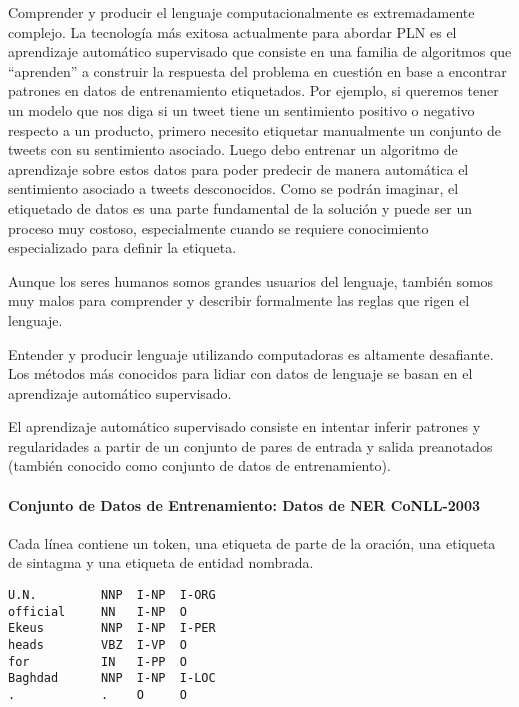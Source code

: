 \documentclass{book}
\begin{document}
Comprender y producir el lenguaje computacionalmente es extremadamente complejo.  La tecnología más exitosa actualmente para abordar PLN es el aprendizaje automático supervisado que consiste en una familia de algoritmos que “aprenden” a construir la respuesta del problema en cuestión en base a encontrar patrones en datos de entrenamiento etiquetados. Por ejemplo, si queremos tener un modelo que nos diga si un tweet tiene un sentimiento positivo o negativo respecto a un producto, primero necesito  etiquetar manualmente un conjunto de tweets con su sentimiento asociado. Luego debo entrenar un algoritmo de aprendizaje sobre estos datos para poder predecir de manera automática el sentimiento asociado a tweets desconocidos. Como se podrán imaginar, el etiquetado de datos es una parte fundamental de la solución y puede ser un proceso muy costoso, especialmente cuando se requiere conocimiento especializado para definir la etiqueta.

Aunque los seres humanos somos grandes usuarios del lenguaje, también somos muy malos para comprender y describir formalmente las reglas que rigen el lenguaje.

Entender y producir lenguaje utilizando computadoras es altamente desafiante. Los métodos más conocidos para lidiar con datos de lenguaje se basan en el aprendizaje automático supervisado.

El aprendizaje automático supervisado consiste en intentar inferir patrones y regularidades a partir de un conjunto de pares de entrada y salida preanotados (también conocido como conjunto de datos de entrenamiento).

\paragraph{Conjunto de Datos de Entrenamiento: Datos de NER CoNLL-2003}

Cada línea contiene un token, una etiqueta de parte de la oración, una etiqueta de sintagma y una etiqueta de entidad nombrada.
\begin{center}
\begin{verbatim}
U.N.         NNP  I-NP  I-ORG
official     NN   I-NP  O
Ekeus        NNP  I-NP  I-PER
heads        VBZ  I-VP  O
for          IN   I-PP  O
Baghdad      NNP  I-NP  I-LOC
.            .    O     O
\end{verbatim}
\end{center}

\end{document}
